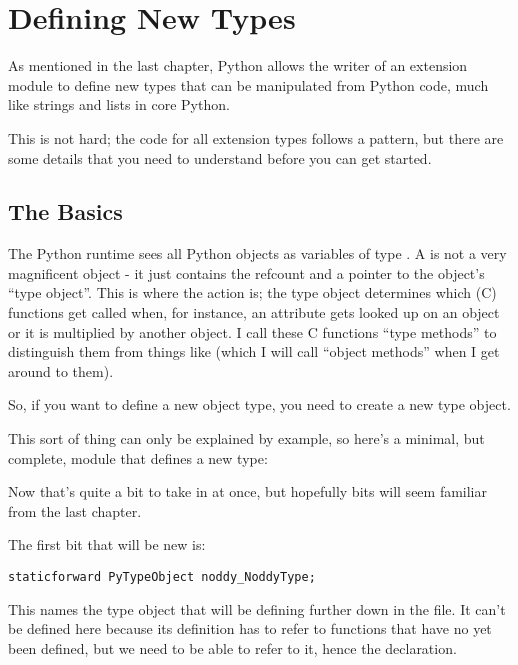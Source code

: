 \chapter{Defining New Types
        \label{defining-new-types}}

As mentioned in the last chapter, Python allows the writer of an
extension module to define new types that can be manipulated from
Python code, much like strings and lists in core Python.

This is not hard; the code for all extension types follows a pattern,
but there are some details that you need to understand before you can
get started.

\section{The Basics
    \label{dnt-basics}}

The Python runtime sees all Python objects as variables of type
.  A  is not a very magnificent
object - it just contains the refcount and a pointer to the object's
``type object''.  This is where the action is; the type object
determines which (C) functions get called when, for instance, an
attribute gets looked up on an object or it is multiplied by another
object.  I call these C functions ``type methods'' to distinguish them
from things like  (which I will call ``object
methods'' when I get around to them).

So, if you want to define a new object type, you need to create a new
type object.

This sort of thing can only be explained by example, so here's a
minimal, but complete, module that defines a new type:



Now that's quite a bit to take in at once, but hopefully bits will
seem familiar from the last chapter.

The first bit that will be new is:

\begin{verbatim}
staticforward PyTypeObject noddy_NoddyType;
\end{verbatim}

This names the type object that will be defining further down in the
file.  It can't be defined here because its definition has to refer to
functions that have no yet been defined, but we need to be able to
refer to it, hence the declaration.

